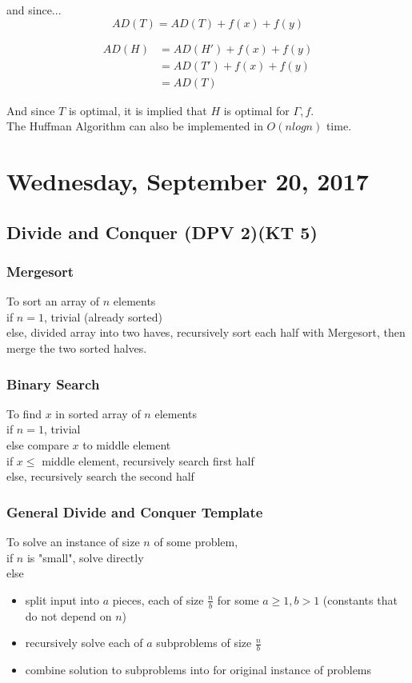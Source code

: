 \documentclass[12pt]{article}
\begin{document}
and since...
$$AD(T) = AD(T) + f(x) + f(y)$$

\begin{align*}
	AD(H) &= AD(H') + f(x) + f(y)\\
	&= AD(T') + f(x) + f(y)\\
	&= AD(T)
\end{align*}

And since $T$ is optimal, it is implied that $H$ is optimal for $\Gamma, f$.\\
The Huffman Algorithm can also be implemented in $O(nlogn)$ time.

\newpage

\section{Wednesday, September 20, 2017}

\subsection{Divide and Conquer (DPV 2)(KT 5)}

\subsubsection{Mergesort}

To sort an array of $n$ elements\\
if $n=1$, trivial (already sorted)\\
else, divided array into two haves, recursively sort each half with Mergesort, then merge the two sorted halves.

\subsubsection{Binary Search}

To find $x$ in sorted array of $n$ elements\\
if $n=1$, trivial\\
else compare $x$ to middle element\\
	if $x\leq$ middle element, recursively search first half\\
	else, recursively search the second half
	
\subsubsection{General Divide and Conquer Template}

To solve an instance of size $n$ of some problem,\\
if $n$ is "small", solve directly\\
else
\begin{itemize}
	\item{split input into $a$ pieces, each of size $\frac{n}{b}$ for some $a\geq 1, b>1$ (constants that do not depend on $n$)}
	\item{recursively solve each of $a$ subproblems of size $\frac{n}{b}$}
	\item{combine solution to subproblems into for original instance of problems}
\end{itemize}
\end{document}
